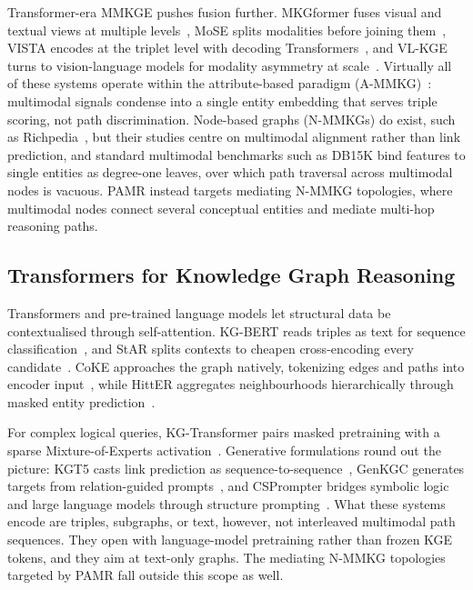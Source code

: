 \documentclass[runningheads]{llncs}
\begin{document}
Transformer-era MMKGE pushes fusion further. MKGformer fuses visual and textual views at multiple levels~\cite{chen2022mkgformer}, MoSE splits modalities before joining them~\cite{zhao2022mose}, VISTA encodes at the triplet level with decoding Transformers~\cite{lee2023vista}, and VL-KGE turns to vision-language models for modality asymmetry at scale~\cite{efthymiou2026vlkge}. Virtually all of these systems operate within the attribute-based paradigm (A-MMKG)~\cite{zhu2024multimodal}: multimodal signals condense into a single entity embedding that serves triple scoring, not path discrimination. Node-based graphs (N-MMKGs) do exist, such as Richpedia~\cite{wang2020richpedia}, but their studies centre on multimodal alignment rather than link prediction, and standard multimodal benchmarks such as DB15K bind features to single entities as degree-one leaves, over which path traversal across multimodal nodes is vacuous. PAMR instead targets mediating N-MMKG topologies, where multimodal nodes connect several conceptual entities and mediate multi-hop reasoning paths.

\subsection{Transformers for Knowledge Graph Reasoning}
\label{sec:rw-transformers}

Transformers and pre-trained language models let structural data be contextualised through self-attention. KG-BERT reads triples as text for sequence classification~\cite{yao2019kg}, and StAR splits contexts to cheapen cross-encoding every candidate~\cite{wang2021star}. CoKE approaches the graph natively, tokenizing edges and paths into encoder input~\cite{wang2019coke}, while HittER aggregates neighbourhoods hierarchically through masked entity prediction~\cite{chen2021hitter}.

For complex logical queries, KG-Transformer pairs masked pretraining with a sparse Mixture-of-Experts activation~\cite{liu2022mask}. Generative formulations round out the picture: KGT5 casts link prediction as sequence-to-sequence~\cite{saxena2022kgt5}, GenKGC generates targets from relation-guided prompts~\cite{zhu2022genkgc}, and CSPrompter bridges symbolic logic and large language models through structure prompting~\cite{chen2023csprompter}. What these systems encode are triples, subgraphs, or text, however, not interleaved multimodal path sequences. They open with language-model pretraining rather than frozen KGE tokens, and they aim at text-only graphs. The mediating N-MMKG topologies targeted by PAMR fall outside this scope as well.
\end{document}
